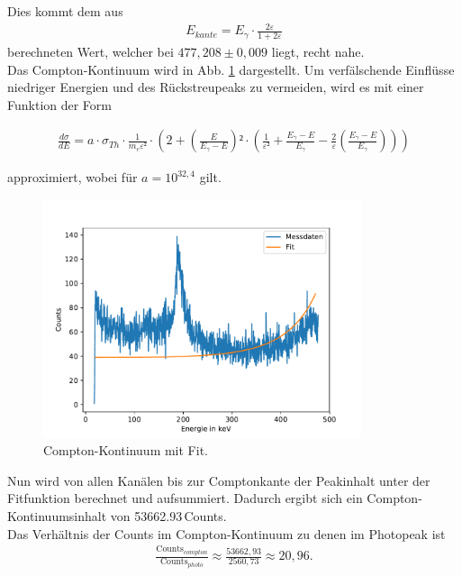     Dies kommt dem aus
    \begin{align*}
      E_{kante}=E_{\gamma}\cdot\frac{2\varepsilon}{1+2\varepsilon}
    \end{align*}
    berechneten Wert, welcher bei $477,208\pm 0,009$ liegt, recht nahe.\\

    Das Compton-Kontinuum wird in Abb. \ref{fig:kontiganz}
    dargestellt. Um verfälschende Einflüsse niedriger Energien und
    des Rückstreupeaks zu vermeiden, wird es mit einer Funktion der Form

    \begin{align*}
      \frac{d\sigma}{dE}=
      a \cdot \sigma_{Th} \cdot \frac{1}{m_e \varepsilon²}\cdot
      \left(2+\left(\frac E{E_{\gamma}-E}\right)²\cdot \left(\frac1{\varepsilon²}+\frac{E_{\gamma}-E}{E_{\gamma}}-\frac2\varepsilon\left(\frac{E_{\gamma}-E}{E_{\gamma}}\right)\right)\right)
    \end{align*}

    approximiert, wobei für $a=10 ^{32,4}$ gilt.

    \begin{figure}[H]
      \centering
      \includegraphics[height=7cm]{germanib/compton/comptonfitneu.pdf}
      \caption{Compton-Kontinuum mit Fit.}
      \label{fig:kontiganz}
    \end{figure}

    Nun wird von allen Kanälen bis zur Comptonkante der Peakinhalt unter
    der Fitfunktion berechnet und aufsummiert.
    Dadurch ergibt sich ein Compton-Kontinuumsinhalt von
    53662.93\,Counts. \\
    Das Verhältnis der Counts im Compton-Kontinuum zu denen im Photopeak
    ist
    \begin{align*}
      \frac{\text{Counts}_{compton}}{\text{Counts}_{photo}}
      \approx \frac{53662,93}{2560,73} \approx 20,96.
    \end{align*}

